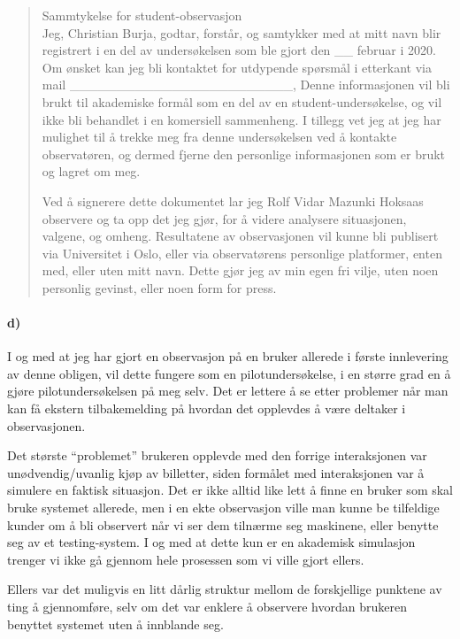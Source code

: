 \documentclass{../../myassignment}
\begin{document}
	\begin{quote}
		Sammtykelse for student-observasjon\\

		Jeg, Christian Burja, godtar, forst{\aa}r, og samtykker med at mitt navn blir registrert i en del av unders{\o}kelsen som ble gjort den \_\_ februar i 2020. Om ønsket kan jeg bli kontaktet for utdypende spørsmål i etterkant via mail \_\_\_\_\_\_\_\_\_\_\_\_\_\_\_\_\_\_\_\_\_\_\_\_, Denne informasjonen vil bli brukt til akademiske form{\aa}l som en del av en student-unders{\o}kelse, og vil ikke bli behandlet i en komersiell sammenheng. I tillegg vet jeg at jeg har mulighet til å trekke meg fra denne undersøkelsen ved å kontakte observatøren, og dermed fjerne den personlige informasjonen som er brukt og lagret om meg. 

		Ved {\aa} signerere dette dokumentet lar jeg Rolf Vidar Mazunki Hoksaas observere og ta opp det jeg gj{\o}r, for {\aa} videre analysere situasjonen, valgene, og omheng. Resultatene av observasjonen vil kunne bli publisert via Universitet i Oslo, eller via observatørens personlige platformer, enten med, eller uten mitt navn. Dette gj{\o}r jeg av min egen fri vilje, uten noen personlig gevinst, eller noen form for press. 



	\end{quote}


	\paragraph*{d)}
	I og med at jeg har gjort en observasjon på en bruker allerede i første innlevering av denne obligen, vil dette fungere som en pilotundersøkelse, i en større grad en å gjøre pilotundersøkelsen på meg selv. Det er lettere å se etter problemer når man kan få ekstern tilbakemelding på hvordan det opplevdes å være deltaker i observasjonen. 

	Det største ``problemet'' brukeren opplevde med den forrige interaksjonen var unødvendig/uvanlig kjøp av billetter, siden formålet med interaksjonen var å simulere en faktisk situasjon. Det er ikke alltid like lett å finne en bruker som skal bruke systemet allerede, men i en ekte observasjon ville man kunne be tilfeldige kunder om å bli observert når vi ser dem tilnærme seg maskinene, eller benytte seg av et testing-system. I og med at dette kun er en akademisk simulasjon trenger vi ikke gå gjennom hele prosessen som vi ville gjort ellers. 

	Ellers var det muligvis en litt dårlig struktur mellom de forskjellige punktene av ting å gjennomføre, selv om det var enklere å observere hvordan brukeren benyttet systemet uten å innblande seg.
\end{document}
